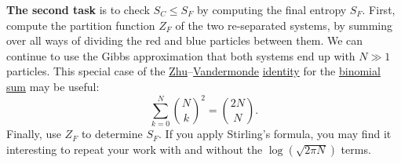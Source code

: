 \documentclass[12 pt]{article} %
\begin{document}
\textbf{The second task} is to check $S_C \leq S_F$ by computing the final entropy $S_F$.
First, compute the partition function $Z_F$ of the two re-separated systems, by summing over all ways of dividing the red and blue particles between them.
We can continue to use the Gibbs approximation that both systems end up with $N \gg 1$ particles.
This special case of the \href{https://en.wikipedia.org/wiki/Zhu_Shijie}{Zhu}--\href{https://en.wikipedia.org/wiki/Alexandre-Theophile_Vandermonde}{Vandermonde} \href{https://en.wikipedia.org/wiki/Vandermonde's_identity}{identity} for the \href{https://mathworld.wolfram.com/BinomialSums.html}{binomial sum} may be useful:
\begin{equation*}
  \sum_{k = 0}^N \binom{N}{k}^2 = \binom{2N}{N}.
\end{equation*}
Finally, use $Z_F$ to determine $S_F$.
If you apply Stirling's formula, you may find it interesting to repeat your work with and without the $\log\left(\sqrt{2\pi N}\right)$ terms.
\end{document}

